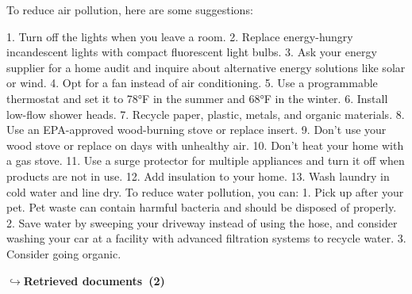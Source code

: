 \documentclass[a4paper,11pt]{article}
\begin{document}
\begin{agentbubble}
To reduce air pollution, here are some suggestions:

1. Turn off the lights when you leave a room.
2. Replace energy-hungry incandescent lights with compact fluorescent light bulbs.
3. Ask your energy supplier for a home audit and inquire about alternative energy solutions like solar or wind.
4. Opt for a fan instead of air conditioning.
5. Use a programmable thermostat and set it to 78°F in the summer and 68°F in the winter.
6. Install low-flow shower heads.
7. Recycle paper, plastic, metals, and organic materials.
8. Use an EPA-approved wood-burning stove or replace insert.
9. Don’t use your wood stove or replace on days with unhealthy air.
10. Don’t heat your home with a gas stove.
11. Use a surge protector for multiple appliances and turn it off when products are not in use.
12. Add insulation to your home.
13. Wash laundry in cold water and line dry.
To reduce water pollution, you can:
1. Pick up after your pet. Pet waste can contain harmful bacteria and should be disposed of properly.
2. Save water by sweeping your driveway instead of using the hose, and consider washing your car at a facility with advanced filtration systems to recycle water.
3. Consider going organic.
\end{agentbubble}
\noindent\hfill{\footnotesize\textcolor{doccolor}{\textbf{$\hookrightarrow$\enspace Retrieved documents~(2)}}}
\end{document}
